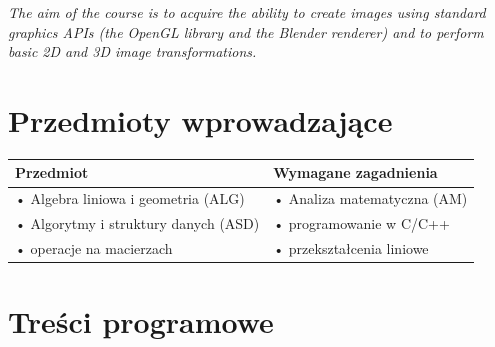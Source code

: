 \documentclass[12pt, a4paper]{article}
\newcommand{\thdrule}{\noalign{\global\setlength{\extrarowheight}{0pt}}}
\newcommand{\thdend}{\noalign{\global\setlength{\extrarowheight}{3pt}}}
\begin{document}
\textit{The aim of the course is to acquire the ability to create images using standard graphics APIs (the OpenGL library and the Blender renderer) and to perform basic 2D and 3D image transformations.}


\section{Przedmioty wprowadzające}

{\scriptsize
\begin{tabularx}{\textwidth}{m{5cm}Y}
\thdrule\toprule
{} {\color{white}\textbf{Przedmiot}} & {\color{white}\textbf{Wymagane zagadnienia}} \\
\midrule\thdend
   • Algebra liniowa i geometria  (ALG) & • Analiza matematyczna  (AM) \\
   • Algorytmy i struktury danych (ASD) & • programowanie w C/C++ \\
   • operacje na macierzach & • przekształcenia liniowe \\
\bottomrule
\end{tabularx}}

\section{Treści programowe}
\end{document}
